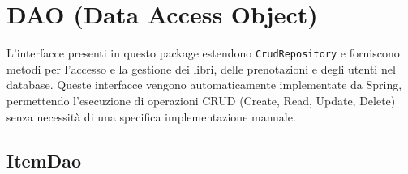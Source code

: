 \documentclass[twoside,openright,titlepage,fleqn,headinclude,12pt,a4paper,BCOR=5mm,footinclude]{scrbook}
\begin{document}
\section{DAO (Data Access Object)}

L’interfacce presenti in questo package estendono \texttt{CrudRepository} e forniscono metodi per l’accesso e la gestione dei libri, delle prenotazioni e degli utenti nel database. Queste interfacce vengono automaticamente implementate da Spring, permettendo l’esecuzione di operazioni CRUD (Create, Read, Update, Delete) senza necessità di una specifica implementazione manuale.

\subsection{ItemDao}
\end{document}
